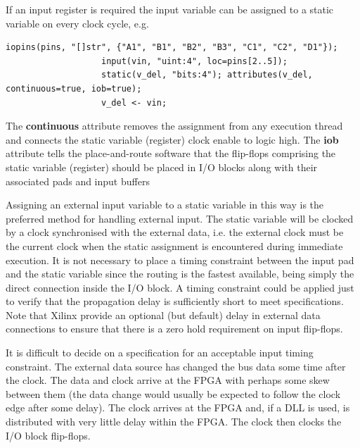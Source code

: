             If an input register is required the input variable can be
            assigned to a static variable on every clock cycle, e.g.
            \begin{lstlisting}[gobble=12, language=threepl]
                   iopins(pins, "[]str", {"A1", "B1", "B2", "B3", "C1", "C2", "D1"});
                   input(vin, "uint:4", loc=pins[2..5]);
                   static(v_del, "bits:4"); attributes(v_del, continuous=true, iob=true);
                   v_del <- vin;
            \end{lstlisting}
            The {\bf continuous} attribute removes the assignment from any
            execution thread and connects the static variable (register)
            clock enable to logic high. The {\bf iob} attribute tells the
            place-and-route software that the flip-flops comprising the
            static variable (register) should be placed in I/O blocks along
            with their associated pads and input buffers

            Assigning an external input variable to a static variable in this way
            is the preferred method for handling external input. The static
            variable will be clocked by a clock synchronised with the external
            data, i.e. the external clock must be the current clock when the static
            assignment is encountered during immediate execution. It is not
            necessary to place a timing constraint between the input pad and the
            static variable since the routing is the fastest available, being
            simply the direct connection inside the I/O block. A timing constraint
            could be applied just to verify that the propagation delay is
            sufficiently short to meet specifications. Note that Xilinx provide an
            optional (but default) delay in external data connections to ensure
            that there is a zero hold requirement on input flip-flops.

            It is difficult to decide on a specification for an acceptable input
            timing constraint. The external data source has changed the bus data
            some time after the clock. The data and clock arrive at the FPGA with
            perhaps some skew between them (the data change would usually be
            expected to follow the clock edge after some delay). The clock arrives
            at the FPGA and, if a DLL is used, is distributed with very little
            delay within the FPGA. The clock then clocks the I/O block flip-flops.

